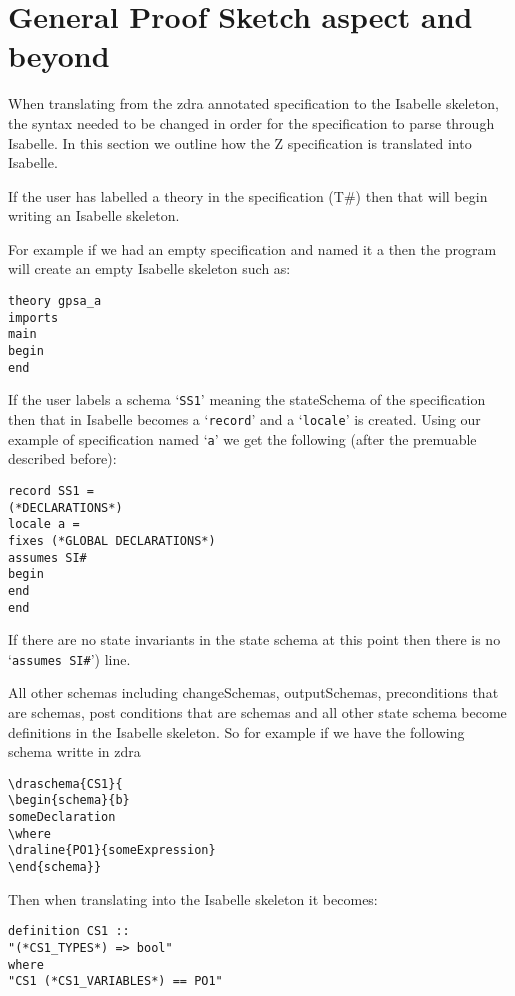 \chapter{General Proof Sketch aspect and beyond}
\label{chap:gpsa2isa}

When translating from the \gls{zdra} annotated specification to the Isabelle
skeleton, the syntax needed to be changed in order for the specification to
parse through Isabelle. In this section we outline how the Z specification is
translated into Isabelle.

If the user has labelled a theory in the specification (T\#) then that will
begin writing an Isabelle skeleton.

For example if we had an empty specification and named it a then the program
will create an empty Isabelle skeleton such as:

\begin{verbatim}
theory gpsa_a
imports
main
begin
end
\end{verbatim}

If the user labels a schema `\texttt{SS1}' meaning the stateSchema of the
specification then that in Isabelle becomes a `\texttt{record}' and a
`\texttt{locale}' is created. Using our example of specification named
`\texttt{a}' we get the following (after the premuable described before):
\begin{verbatim}
record SS1 =
(*DECLARATIONS*)
locale a =
fixes (*GLOBAL DECLARATIONS*)
assumes SI#
begin
end
end
\end{verbatim}

If there are no state invariants in the state schema at this point then there is
no `\texttt{assumes SI\#}') line.

All other schemas including changeSchemas, outputSchemas, preconditions that are
schemas, post conditions that are schemas and all other state schema become
definitions in the Isabelle skeleton. So for example if we have the following
schema writte in \gls{zdra}
\begin{verbatim}
\draschema{CS1}{
\begin{schema}{b}
someDeclaration
\where
\draline{PO1}{someExpression}
\end{schema}}
\end{verbatim}

Then when translating into the Isabelle skeleton it becomes:
\begin{verbatim}
definition CS1 ::
"(*CS1_TYPES*) => bool"
where
"CS1 (*CS1_VARIABLES*) == PO1"
\end{verbatim}

